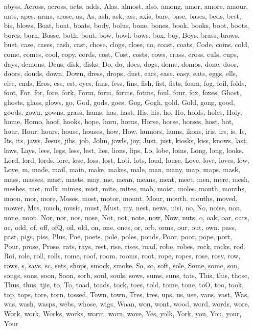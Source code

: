 abyss, Across, across, acts, adds, Alas, almost, also, among, amor, amore, amour, ants, apes, arms, arose, as, As, ash, ask, ass, axis, bars, base, bases, beds, best, bis, blows, Boat, boat, boats, body, bolus, bone, bones, book, books, boot, boots, bores, born, Bosse, both, bout, bow, bowl, bows, box, boy, Boys, brass, brows, bust, case, cases, cash, cast, chose, clogs, close, co, coast, coats, Code, coins, cold, come, comes, cool, copy, cords, cost, Cost, costs, cows, crass, cross, cuIs, cups, days, demons, Deus, disk, disks, Do, do, does, dogs, dome, domos, done, door, doors, douds, down, Down, dress, drops, dust, ears, ease, easy, eats, eggs, ells, else, ends, Eros, ess, est, eyes, fans, fess, fins, fish, fist, fists, foam, fog, foil, folds, foot, For, for, fore, fork, Form, form, forms, fotms, foul, four, fox, foxes, Ghost, ghosts, glass, glows, go, God, gods, goes, Gog, Gogh, gold, Gold, gong, good, goods, gown, gowns, grass, hams, has, hast, His, his, ho, Ho, holds, holes, Holy, home, Homo, hoof, hooks, hope, horn, horns, Horse, horse, horses, host, hot, hour, Hour, hours, house, houses, how, How, humors, hums, ikons, iris, irs, is, Is, Its, its, jaws, Jesus, jibs, job, John, jowls, joy, Just, just, kiosks, kiss, knows, last, laws, Lays, lees, legs, less, lest, lies, lions, lips, Lo, lobe, loins, Long, long, looks, Lord, lord, lords, lore, lose, loss, lost, Loti, lots, loud, louse, Love, love, loves, low, Loye, m, made, mail, main, make, makes, male, man, many, map, maps, mask, mass, masses, mast, masts, may, me, mean, means, meat, meet, men, mere, mesh, meshes, met, milk, mimes, mist, mite, mites, mob, moist, moles, month, months, moon, mor, more, Moses, most, motor, mount, Mour, mouth, mouths, moved, mower, Mrs, much, music, must, Must, my, nest, news, nisi, no, No, noise, non, none, noon, Nor, nor, nos, nose, Not, not, note, now, Now, nuts, o, oak, oar, oars, oc, odd, of, off, ofQ, oil, old, on, one, ones, or, orb, orms, our, out, own, pass, past, pigs, piss, Plus, Poe, poets, pole, poles, ponds, Poor, poor, pope, port, Pour, prose, Prose, rats, rays, rest, rise, rises, road, robe, robes, rock, rocks, rod, Roi, role, roll, rolls, rome, roof, room, rooms, root, rope, ropes, rose, rosy, row, rows, s, says, sc, sets, shops, smock, smoke, So, so, soft, sole, Some, some, son, songs, sons, soon, Soon, sorb, soul, souls, sows, sums, suns, tats, This, this, those, Thus, thus, tjis, to, To, toad, toads, tock, toes, told, tome, tone, toO, too, took, top, tops, tore, torn, tossed, Town, town, Tres, tres, ups, us, use, vans, vast, Was, was, wash, wasps, webs, whose, wigs, Woan, won, wont, wood, word, words, wore, Work, work, Works, works, worm, worn, wove, Yes, yolk, York, you, You, your, Your


